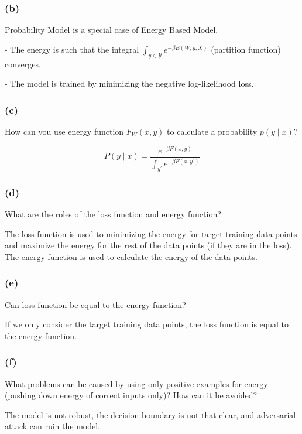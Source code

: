 \subsubsection*{(b)}
Probability Model is a special case of Energy Based Model.

- The energy is such that the integral $\int_{y \in \mathcal{Y}} e^{-\beta E(W, y, X)}$ (partition function) converges.

- The model is trained by minimizing the negative log-likelihood loss.

\subsubsection*{(c)}
How can you use energy function $F_W(x, y)$ to calculate a probability $p(y \mid x)$?

\begin{equation}
    P(y \mid x)=\frac{e^{-\beta F(x, y)}}{\int_{y^{\prime}} e^{-\beta F\left(x, y^{\prime}\right)}}
\end{equation}

\subsubsection*{(d)}
What are the roles of the loss function and energy function?

The loss function is used to minimizing the energy for target training data points and maximize the energy for the rest of the data points (if they are in the loss).
The energy function is used to calculate the energy of the data points.


\subsubsection*{(e)}
Can loss function be equal to the energy function?

If we only consider the target training data points, the loss function is equal to the energy function.

\subsubsection*{(f)}
What problems can be caused by using only positive examples for energy (pushing down energy of correct inputs only)? How can it be avoided?

The model is not robust, the decision boundary is not that clear, and adversarial attack can ruin the model.

